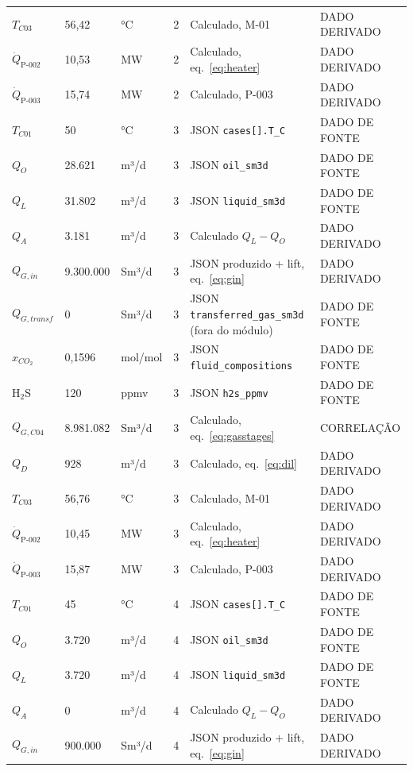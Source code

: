 \documentclass[11pt,a4paper]{article}
\numberwithin{equation}{section}
\numberwithin{table}{section}
\numberwithin{figure}{section}
\newcommand{\tipo}[1]{\textsf{\footnotesize #1}}
\begin{document}
{\begin{longtable}{L{3.6cm}L{2.2cm}lL{1.0cm}L{4.2cm}l}
$T_{C03}$ & 56,42 & °C & 2 & Calculado, M-01 & \tipo{DADO DERIVADO}\\
$\dot Q_{\mbox{P-002}}$ & 10,53 & MW & 2 & Calculado, eq.~\eqref{eq:heater} & \tipo{DADO DERIVADO}\\
$\dot Q_{\mbox{P-003}}$ & 15,74 & MW & 2 & Calculado, P-003 & \tipo{DADO DERIVADO}\\
$T_{C01}$ & 50 & °C & 3 & JSON \texttt{cases[].T\_C} & \tipo{DADO DE FONTE}\\
$Q_{O}$ & 28.621 & m³/d & 3 & JSON \texttt{oil\_sm3d} & \tipo{DADO DE FONTE}\\
$Q_{L}$ & 31.802 & m³/d & 3 & JSON \texttt{liquid\_sm3d} & \tipo{DADO DE FONTE}\\
$Q_{A}$ & 3.181 & m³/d & 3 & Calculado $Q_L-Q_O$ & \tipo{DADO DERIVADO}\\
$Q_{G,in}$ & 9.300.000 & Sm³/d & 3 & JSON produzido + lift, eq.~\eqref{eq:gin} & \tipo{DADO DERIVADO}\\
$Q_{G,transf}$ & 0 & Sm³/d & 3 & JSON \texttt{transferred\_gas\_sm3d} (fora do módulo) & \tipo{DADO DE FONTE}\\
$x_{CO_2}$ & 0{,}1596 & mol/mol & 3 & JSON \texttt{fluid\_compositions} & \tipo{DADO DE FONTE}\\
H$_2$S & 120 & ppmv & 3 & JSON \texttt{h2s\_ppmv} & \tipo{DADO DE FONTE}\\
$Q_{G,C04}$ & 8.981.082 & Sm³/d & 3 & Calculado, eq.~\eqref{eq:gasstages} & \tipo{CORRELAÇÃO}\\
$Q_{D}$ & 928 & m³/d & 3 & Calculado, eq.~\eqref{eq:dil} & \tipo{DADO DERIVADO}\\
$T_{C03}$ & 56,76 & °C & 3 & Calculado, M-01 & \tipo{DADO DERIVADO}\\
$\dot Q_{\mbox{P-002}}$ & 10,45 & MW & 3 & Calculado, eq.~\eqref{eq:heater} & \tipo{DADO DERIVADO}\\
$\dot Q_{\mbox{P-003}}$ & 15,87 & MW & 3 & Calculado, P-003 & \tipo{DADO DERIVADO}\\
$T_{C01}$ & 45 & °C & 4 & JSON \texttt{cases[].T\_C} & \tipo{DADO DE FONTE}\\
$Q_{O}$ & 3.720 & m³/d & 4 & JSON \texttt{oil\_sm3d} & \tipo{DADO DE FONTE}\\
$Q_{L}$ & 3.720 & m³/d & 4 & JSON \texttt{liquid\_sm3d} & \tipo{DADO DE FONTE}\\
$Q_{A}$ & 0 & m³/d & 4 & Calculado $Q_L-Q_O$ & \tipo{DADO DERIVADO}\\
$Q_{G,in}$ & 900.000 & Sm³/d & 4 & JSON produzido + lift, eq.~\eqref{eq:gin} & \tipo{DADO DERIVADO}\\

\end{longtable}}
\end{document}
